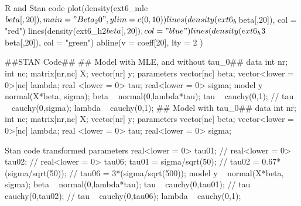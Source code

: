 \documentclass{article}
\begin{document}
\begin{sexylisting}{R and Stan code}
plot(density(ext6_mle$beta[,20]), main = "Beta_20", ylim = c(0,10))
lines(density(ext6_h$beta[,20]), col = "red")
lines(density(ext6_h2$beta[,20]), col = "blue")
lines(density(ext6_h3$beta[,20]), col = "green")
abline(v = coeff[20], lty = 2 )

##STAN Code##
## Model with MLE, and without tau_0##
data{
  int nr;
  int nc;
  matrix[nr,nc] X;
  vector[nr] y;
}
parameters{
  vector[nc] beta;
  vector<lower = 0>[nc] lambda;
  real <lower = 0> tau;
  real<lower = 0> sigma;
}
model{
  y ~ normal(X*beta, sigma);
  beta ~ normal(0,lambda*tau);
   tau ~ cauchy(0,1);
  // tau ~ cauchy(0,sigma);
  lambda ~ cauchy(0,1);
}
## Model with tau_0##
data{
  int nr;
  int nc;
  matrix[nr,nc] X;
  vector[nr] y;
}
parameters{
  vector[nc] beta;
  vector<lower = 0>[nc] lambda;
  real <lower = 0> tau;
  real<lower = 0> sigma;
}
\end{sexylisting}
\begin{sexylisting}{Stan code}
transformed parameters{
  real<lower = 0> tau01;
  // real<lower = 0> tau02;
 // real<lower = 0> tau06;
  tau01 = sigma/sqrt(50);
  // tau02 = 0.67*(sigma/sqrt(50));
 // tau06 = 3*(sigma/sqrt(500));
}
model{
  y ~ normal(X*beta, sigma);
  beta ~ normal(0,lambda*tau);
  tau ~ cauchy(0,tau01);
  // tau ~ cauchy(0,tau02);
 // tau ~ cauchy(0,tau06);
  lambda ~ cauchy(0,1);
}



\end{sexylisting}



 
\end{document}
